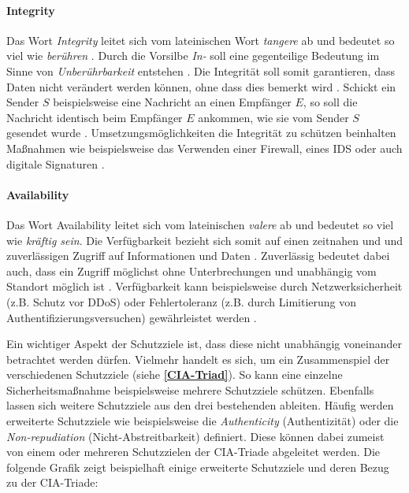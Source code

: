 \paragraph*{Integrity}  
Das Wort \textit{Integrity} leitet sich vom lateinischen Wort \textit{tangere} ab und bedeutet so viel wie \textit{berühren} \cite{pons}. Durch die Vorsilbe \textit{In-} soll eine gegenteilige Bedeutung  im Sinne von \textit{Unberührbarkeit} entstehen \cite{samonas2014cia}. 
Die Integrität soll somit garantieren, dass Daten nicht verändert werden können, ohne dass dies bemerkt wird \cite{agarwal2011security}. Schickt ein Sender $S$ beispielsweise eine Nachricht an einen Empfänger $E$, so soll die Nachricht identisch beim Empfänger $E$ ankommen, wie sie vom Sender $S$ gesendet wurde \cite{agarwal2011security}.
Umsetzungsmöglichkeiten die Integrität zu schützen beinhalten Maßnahmen wie beispielsweise das Verwenden einer Firewall, eines \ac{IDS} oder auch digitale Signaturen \cite{agarwal2011security}.

\paragraph*{Availability}
Das Wort Availability leitet sich vom lateinischen \textit{valere} ab und bedeutet so viel wie \textit{kräftig sein}. Die Verfügbarkeit bezieht sich somit auf einen zeitnahen und und zuverlässigen Zugriff auf Informationen und Daten \cite{samonas2014cia}. Zuverlässig bedeutet dabei auch, dass ein Zugriff möglichst ohne Unterbrechungen und unabhängig vom Standort möglich ist \cite{agarwal2011security}.
Verfügbarkeit kann beispielsweise durch Netzwerksicherheit (z.B. Schutz vor \ac{DDoS}) oder Fehlertoleranz (z.B. durch Limitierung von Authentifizierungsversuchen) gewährleistet werden \cite{agarwal2011security}.

Ein wichtiger Aspekt der Schutzziele ist, dass diese nicht unabhängig voneinander betrachtet werden dürfen. Vielmehr handelt es sich, um ein Zusammenspiel der verschiedenen Schutzziele (siehe \textbf{\ref{CIA-Triad}}). So kann eine einzelne Sicherheitsmaßnahme beispielsweise mehrere Schutzziele schützen. Ebenfalls lassen sich weitere Schutzziele aus den drei bestehenden ableiten. Häufig werden erweiterte Schutzziele wie beispielsweise die \textit{Authenticity} (Authentizität) oder die \textit{Non-repudiation} (Nicht-Abstreitbarkeit) \cite{samonas2014cia} definiert. Diese können dabei zumeist von einem oder mehreren Schutzzielen der CIA-Triade abgeleitet werden. Die folgende Grafik zeigt beispielhaft einige erweiterte Schutzziele und deren Bezug zu der CIA-Triade:

